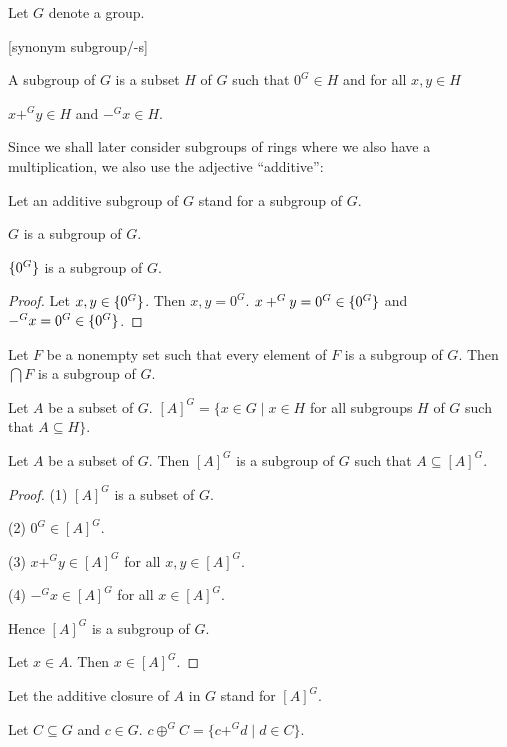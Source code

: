 \documentclass[11pt]{article}
\begin{document}
\begin{forthel}

Let $G$ denote a group. 

[synonym subgroup/-s]

\begin{definition} A subgroup of $G$ is a subset $H$ of $G$ such that
$0^{G} \in H$ and for all $x,y \in H$ 

$x +^{G} y \in H$ and $-^{G} x \in H$.
\end{definition}

\end{forthel}
Since we shall later consider subgroups of rings where we also have a multiplication,
we also use the adjective ``additive'':
\begin{forthel}

Let an additive subgroup of $G$ stand for a subgroup of $G$.

\begin{lemma} $G$ is a subgroup of $G$. \end{lemma}

\begin{lemma} $\{0^{G}\}$ is a subgroup of $G$.
\end{lemma}

\begin{proof}
Let $x,y \in \{0^{G}\}$. Then $x,y = 0^{G}$.
$x +^{G} y = 0^{G} \in \{0^{G}\}$ and $-^{G} x = 0^{G} \in \{0^{G}\}$.
\end{proof}

\begin{lemma} Let $F$ be a nonempty set such that every element of $F$ is a subgroup of $G$.
Then $\bigcap F$ is a subgroup of $G$.
\end{lemma}

\begin{definition}
Let $A$ be a subset of $G$.
$[A]^{G} = \{x \in G \mid x \in H$ for all subgroups $H$ of $G$ 
such that $A \subseteq H\}$.
\end{definition}

\begin{lemma}
Let $A$ be a subset of $G$. Then $[A]^{G}$ is a subgroup of $G$ such
that $A \subseteq [A]^{G}$.
\end{lemma}
\begin{proof}

(1) $[A]^{G}$ is a subset of $G$.

(2) $0^{G} \in [A]^{G}$.

(3) $x +^{G} y \in [A]^{G}$ for all $x,y \in [A]^{G}$.

(4) $-^{G} x \in [A]^{G}$ for all $x \in [A]^{G}$.

Hence $[A]^{G}$ is a subgroup of $G$.

Let $x \in A$. 
Then $x \in [A]^{G}$.
\end{proof}

Let the additive closure of $A$ in $G$ stand for $[A]^{G}$.

\begin{definition}
Let $C \subseteq G$ and $c \in G$.
$c \oplus^{G} C = \{c +^{G} d \mid d \in C\}$.
\end{definition}
\end{forthel}
\end{document}
